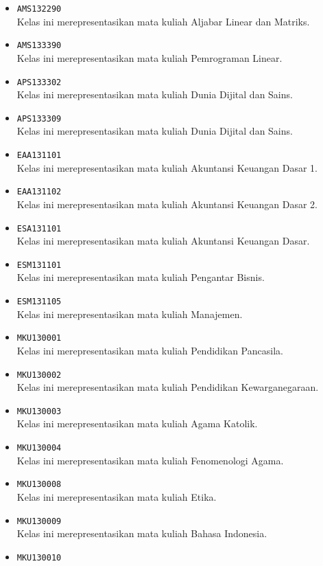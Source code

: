 \begin{enumerate}
\begin{itemize}
\item \texttt{AMS132290} \\
Kelas ini merepresentasikan mata kuliah Aljabar Linear dan Matriks.
\item \texttt{AMS133390} \\
Kelas ini merepresentasikan mata kuliah Pemrograman Linear.
\item \texttt{APS133302} \\
Kelas ini merepresentasikan mata kuliah Dunia Dijital dan Sains.
\item \texttt{APS133309} \\
Kelas ini merepresentasikan mata kuliah Dunia Dijital dan Sains.
\item \texttt{EAA131101} \\
Kelas ini merepresentasikan mata kuliah Akuntansi Keuangan Dasar 1.
\item \texttt{EAA131102} \\
Kelas ini merepresentasikan mata kuliah Akuntansi Keuangan Dasar 2.
\item \texttt{ESA131101} \\
Kelas ini merepresentasikan mata kuliah Akuntansi Keuangan Dasar.
\item \texttt{ESM131101} \\
Kelas ini merepresentasikan mata kuliah Pengantar Bisnis.
\item \texttt{ESM131105} \\
Kelas ini merepresentasikan mata kuliah Manajemen.
\item \texttt{MKU130001} \\
Kelas ini merepresentasikan mata kuliah Pendidikan Pancasila.
\item \texttt{MKU130002} \\
Kelas ini merepresentasikan mata kuliah Pendidikan Kewarganegaraan.
\item \texttt{MKU130003} \\
Kelas ini merepresentasikan mata kuliah Agama Katolik.
\item \texttt{MKU130004} \\
Kelas ini merepresentasikan mata kuliah Fenomenologi Agama.
\item \texttt{MKU130008} \\
Kelas ini merepresentasikan mata kuliah Etika.
\item \texttt{MKU130009} \\
Kelas ini merepresentasikan mata kuliah Bahasa Indonesia.
\item \texttt{MKU130010} \\

\end{itemize}
\end{enumerate}
